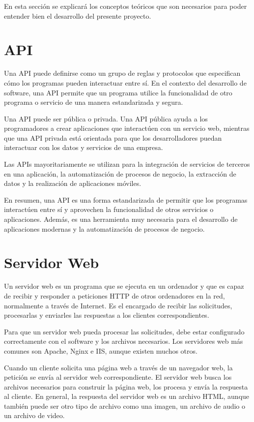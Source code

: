 
En esta sección se explicará los conceptos teóricos que son necesarios para poder entender bien el desarrollo del presente proyecto.


\section{API}

Una API \cite{api} puede definirse como un grupo de reglas y protocolos que especifican cómo los programas pueden interactuar entre sí. En el contexto del desarrollo de software, una API permite que un programa utilice la funcionalidad de otro programa o servicio de una manera estandarizada y segura.

Una API puede ser pública o privada. Una API pública ayuda  a los programadores a crear aplicaciones que interactúen con un servicio web, mientras que una API privada está orientada para que los desarrolladores puedan interactuar con los datos y servicios de una empresa.

Las APIs mayoritariamente se utilizan para la integración de servicios de terceros en una aplicación, la automatización de procesos de negocio, la extracción de datos y la realización de aplicaciones móviles.

En resumen, una API es una forma estandarizada de permitir que los programas interactúen entre sí y aprovechen la funcionalidad de otros servicios o aplicaciones. Además, es una herramienta muy necesaria para el desarrollo de aplicaciones modernas y la automatización de procesos de negocio.


\section{Servidor Web}
Un servidor web  \cite{servidorWeb} es un programa que se ejecuta en un ordenador y que es capaz de recibir y responder a peticiones HTTP de otros ordenadores en la red, normalmente a través de Internet. Es el encargado de recibir las solicitudes, procesarlas y enviarles las respuestas a los clientes correspondientes.

Para que un servidor web pueda procesar las solicitudes, debe estar configurado correctamente con el software y los archivos necesarios. Los servidores web más comunes son Apache, Nginx e IIS, aunque existen muchos otros.

Cuando un cliente solicita una página web a través de un navegador web, la petición se envía al servidor web correspondiente. El servidor web busca los archivos necesarios para construir la página web, los procesa y envía la respuesta al cliente. En general, la respuesta del servidor web es un archivo HTML, aunque también puede ser otro tipo de archivo como una imagen, un archivo de audio o un archivo de video.

